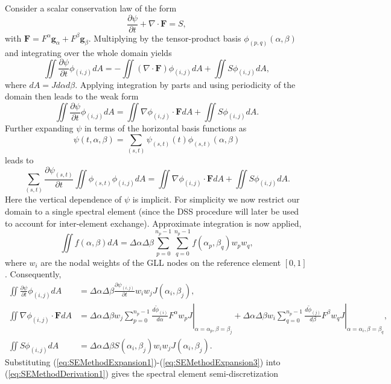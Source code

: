 \documentclass{article}
\newcommand{\vb}{\mathbf}
\newcommand{\diff}[2]{\frac{d #1}{d #2}}
\newcommand{\pdiff}[2]{\frac{\partial #1}{\partial #2}}
\begin{document}
Consider a scalar conservation law of the form
\begin{equation}
\pdiff{\psi}{t} + \nabla \cdot \vb{F} = S,
\end{equation} with $\vb{F} = F^\alpha \vb{g}_\alpha + F^\beta \vb{g}_\beta$.  Multiplying by the tensor-product basis $\phi_{(p,q)}(\alpha, \beta)$ and integrating over the whole domain yields
\begin{equation} \label{eq:SEMethodDerivation1}
\iint \pdiff{\psi}{t} \phi_{(i,j)} dA = - \iint (\nabla \cdot \vb{F}) \phi_{(i,j)} dA + \iint S \phi_{(i,j)} dA,
\end{equation} where $dA = J d\alpha d\beta$.  Applying integration by parts and using periodicity of the domain then leads to the weak form
\begin{equation}
\iint \pdiff{\psi}{t} \phi_{(i,j)} dA = \iint \nabla \phi_{(i,j)} \cdot \vb{F} dA + \iint S \phi_{(i,j)} dA.
\end{equation}  Further expanding $\psi$ in terms of the horizontal basis functions as
\begin{equation}
\psi(t, \alpha, \beta) = \sum_{(s,t)} \psi_{(s,t)}(t) \phi_{(s,t)}(\alpha, \beta)
\end{equation} leads to
\begin{equation}
\sum_{(s,t)} \pdiff{\psi_{(s,t)}}{t} \iint \phi_{(s,t)} \phi_{(i,j)} dA = \iint \nabla \phi_{(i,j)} \cdot \vb{F} dA + \iint S \phi_{(i,j)} dA.
\end{equation}  Here the vertical dependence of $\psi$ is implicit.  For simplicity we now restrict our domain to a single spectral element (since the DSS procedure will later be used to account for inter-element exchange).  Approximate integration is now applied,
\begin{equation}
\iint f(\alpha, \beta) dA = \Delta \alpha \Delta \beta \sum_{p = 0}^{n_p-1} \sum_{q = 0}^{n_p-1} f(\alpha_p, \beta_q) w_p w_q,
\end{equation} where $w_i$ are the nodal weights of the GLL nodes on the reference element $[0,1]$.  Consequently,
\begin{align}
\label{eq:SEMethodExpansion1} \iint \pdiff{\psi}{t} \phi_{(i,j)} dA &= \Delta \alpha \Delta \beta \pdiff{\psi_{(i,j)}}{t} w_i w_j J(\alpha_i, \beta_j), \\
\label{eq:SEMethodExpansion2} \iint \nabla \phi_{(i,j)} \cdot \vb{F} dA &= \Delta \alpha \Delta \beta w_j \sum_{p = 0}^{n_p-1} \left. \diff{\tilde{\phi}_{(i)}}{\alpha} F^\alpha w_p J \right\vert_{\alpha = \alpha_p, \beta = \beta_j} + \Delta \alpha \Delta \beta w_i \sum_{q = 0}^{n_p-1} \left. \diff{\tilde{\phi}_{(j)}}{\beta} F^\beta w_q J \right\vert_{\alpha = \alpha_i, \beta = \beta_q}, \\
\label{eq:SEMethodExpansion3} \iint S \phi_{(i,j)} dA &= \Delta \alpha \Delta \beta S(\alpha_i, \beta_j) w_i w_j J(\alpha_i, \beta_j).
\end{align}  Substituting (\ref{eq:SEMethodExpansion1})-(\ref{eq:SEMethodExpansion3}) into (\ref{eq:SEMethodDerivation1}) gives the spectral element semi-discretization
\end{document}
